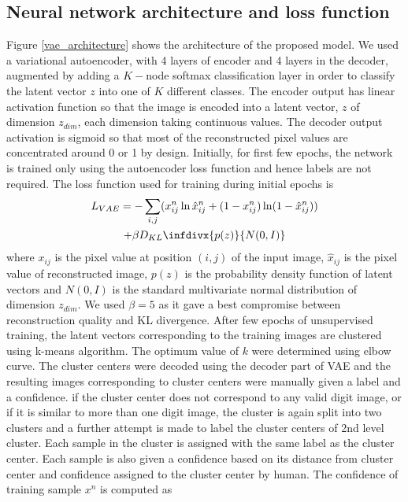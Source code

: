 \documentclass[journal]{IEEEtran}
\newcommand{\infdiv}{D_{KL}\infdivx}
\begin{document}
\subsection{Neural network architecture and loss function}
Figure \ref{vae_architecture} shows the architecture of the proposed model. We used a variational autoencoder\cite{vae}, with 4 layers of encoder and 4 layers in the decoder, augmented by adding a $K-$node softmax classification layer in order to classify the latent vector $z$ into one of $K$ different classes.  The encoder output has linear activation function so that the image is encoded into a latent vector, $z$  of dimension $z_{dim}$, each dimension taking continuous values. The decoder output activation is sigmoid so that most of the reconstructed pixel values  are concentrated around 0 or 1 by design. Initially, for first few epochs, the network is trained only using the autoencoder loss function and hence labels are not required. The loss function used for training during initial epochs is
\begin{multline}
L_{VAE} = -\sum_{i, j}(x_{ij}^n \ln \hat{x}_{ij}^n + (1 - x_{ij}^n) \ln(1 -  \hat{x}_{ij}^n ) )  \\
+ \beta \infdiv{p(z)}{N(0,I)}  
\end{multline}
where   $x_{ij}$ is the pixel value at position $(i, j)$ of the input image, $\hat{x}_{ij}$ is the pixel value of reconstructed image, $p(z)$ is the probability density function of latent vectors and $N(0,I)$ is the standard multivariate normal distribution of dimension $z_{dim}$. We used $\beta = 5$ as it gave a best compromise between reconstruction quality and KL divergence.   After few epochs of unsupervised training, the latent vectors corresponding to the training images are clustered using k-means algorithm. The optimum value of $k$ were determined using elbow curve. The cluster centers were decoded using the decoder part of VAE and the resulting images corresponding to cluster centers were manually given a label and a confidence. if the cluster center does not correspond to any valid digit image, or if it is similar to more than one digit image, the cluster is again split into two clusters and a further attempt is made to label the cluster centers of 2nd level cluster.  Each sample in the cluster is assigned with the  same label as the cluster center. Each sample is also given a confidence based on its distance from cluster center and  confidence assigned to the cluster center by human. The confidence of  training sample $x^n$ is computed as
\end{document}

